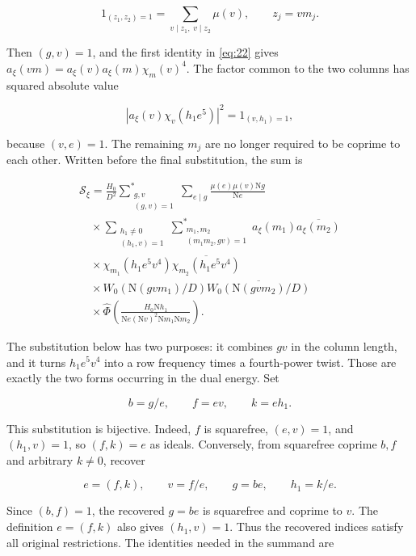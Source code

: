 \documentclass[reqno,a4paper,11pt]{amsart}
\begin{document}
\[
1_{(z_1,z_2)=1}=\sum_{v\mid z_1,\;v\mid z_2}\mu(v),\qquad z_j=vm_j.
\]

Then $(g,v)=1$, and the first identity in \eqref{eq:22} gives $a_\xi(vm)=a_\xi(v)a_\xi(m)\chi_m(v)^4$. The factor common to the two columns has squared absolute value

\[
|a_\xi(v)\chi_v(h_1e^5)|^2=1_{(v,h_1)=1},
\]

because $(v,e)=1$. The remaining $m_j$ are no longer required to be coprime to each other. Written before the final substitution, the sum is

\begin{equation}\label{eq:common-dual}
\begin{gathered}
\mathcal{S}_\xi=\frac{H_0}{D^2}\sum_{\substack{g,v\\(g,v)=1}}^*\sum_{e\mid g}\frac{\mu(e)\mu(v)\mathrm{N}g}{\mathrm{N}e} \\ \quad\times\sum_{\substack{h_1\ne0\\(h_1,v)=1}}\sum_{\substack{m_1,m_2\\(m_1m_2,gv)=1}}^*a_\xi(m_1)\overline{a_\xi(m_2)} \\ \quad\times\chi_{m_1}(h_1e^5v^4)\overline{\chi_{m_2}(h_1e^5v^4)} \\ \quad\times W_0(\mathrm{N}(gvm_1)/D)\overline{W_0(\mathrm{N}(gvm_2)/D)} \\ \quad\times\widehat{\Phi}\left(\frac{H_0\mathrm{N}h_1}{\mathrm{N}e(\mathrm{N}v)^2\mathrm{N}m_1\mathrm{N}m_2}\right).
\end{gathered}
\end{equation}

The substitution below has two purposes: it combines $gv$ in the column length, and it turns $h_1e^5v^4$ into a row frequency times a fourth-power twist. Those are exactly the two forms occurring in the dual energy. Set

\begin{equation}\label{eq:change-variables}
b=g/e,\qquad f=ev,\qquad k=eh_1.
\end{equation}

This substitution is bijective. Indeed, $f$ is squarefree, $(e,v)=1$, and $(h_1,v)=1$, so $(f,k)=e$ as ideals. Conversely, from squarefree coprime $b,f$ and arbitrary $k\ne0$, recover

\[
e=(f,k),\qquad v=f/e,\qquad g=be,\qquad h_1=k/e.
\]

Since $(b,f)=1$, the recovered $g=be$ is squarefree and coprime to $v$. The definition $e=(f,k)$ also gives $(h_1,v)=1$. Thus the recovered indices satisfy all original restrictions. The identities needed in the summand are
\end{document}

